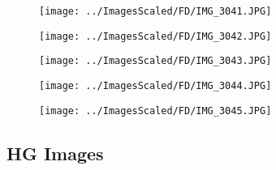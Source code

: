 \begin{figure}[H]
    \centering
    \texttt{[image: ../ImagesScaled/FD/IMG\_3041.JPG]}
\end{figure}
\begin{figure}[H]
    \centering
    \texttt{[image: ../ImagesScaled/FD/IMG\_3042.JPG]}
\end{figure}
\begin{figure}[H]
    \centering
    \texttt{[image: ../ImagesScaled/FD/IMG\_3043.JPG]}
\end{figure}
\begin{figure}[H]
    \centering
    \texttt{[image: ../ImagesScaled/FD/IMG\_3044.JPG]}
\end{figure}
\begin{figure}[H]
    \centering
    \texttt{[image: ../ImagesScaled/FD/IMG\_3045.JPG]}
\end{figure}

\subsection{HG Images}
\label{apx:hg}

